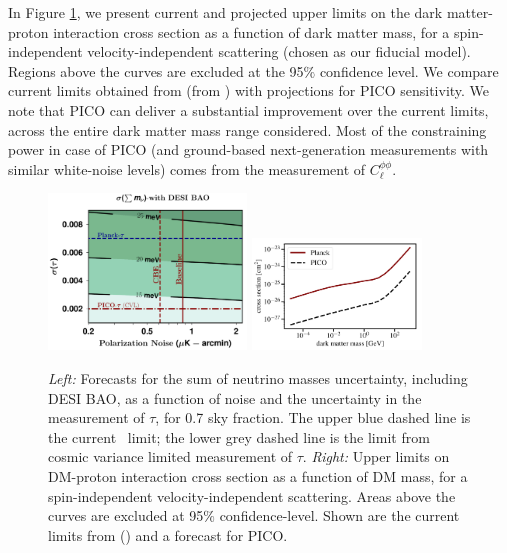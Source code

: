 \documentclass[PICOReport.tex]{subfiles}
\begin{document}
In Figure \ref{fig:DM_baryons}, we present current and projected upper limits on the dark matter-proton interaction cross section as a function of dark matter mass, for a spin-independent velocity-independent scattering (chosen as our fiducial model). Regions above the curves are excluded at the 95$\%$ confidence level. We compare current limits obtained from {\planck} (from \cite{2018PhRvL.121h1301G}) with projections for PICO sensitivity.  We note that PICO can deliver a substantial improvement over the current limits, across the entire dark matter mass range considered.  Most of the constraining power in case of PICO (and ground-based next-generation measurements with similar white-noise levels) comes from the measurement of $C_\ell^{\phi \phi}$.\\
%
\begin{figure}[t]
\begin{center}
\includegraphics[width=0.47\textwidth]{images/Mnu_tauprior_final.pdf}
\includegraphics[width=0.4\textwidth]{images/pico_dm_baryon.pdf}
\caption{\textit{Left:}  Forecasts for the sum of 
neutrino masses uncertainty, including DESI BAO, as a function of noise and the uncertainty in the measurement of $\tau$, 
for 0.7 sky fraction.  The upper blue dashed line is the current \planck~limit; the lower grey dashed line is the limit from cosmic variance 
limited measurement of $\tau$. \textit{Right:} Upper limits on DM-proton interaction cross section as a function of DM mass, for a spin-independent velocity-independent scattering. Areas above the curves are excluded at 95$\%$ confidence-level.
Shown are the current limits from \planck (\cite{2018PhRvL.121h1301G}) and a forecast for PICO.}\label{fig:DM_baryons}
\end{center}
\end{figure}
\end{document}
